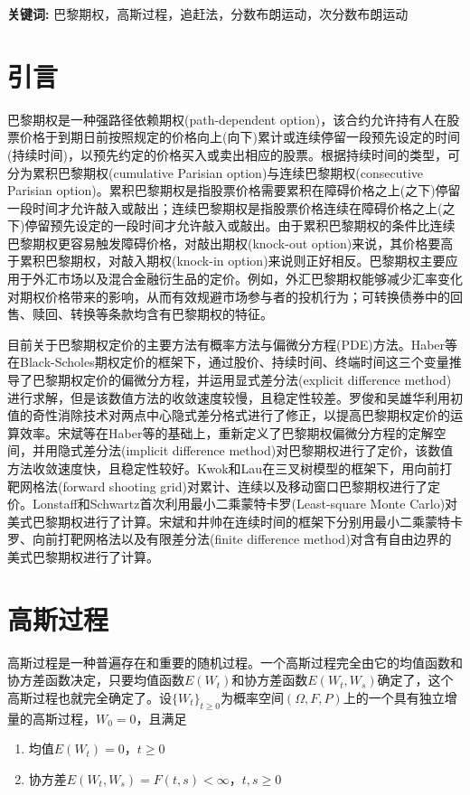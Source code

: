 \documentclass{ctexart} %
\begin{document}
{\bf 关键词: }巴黎期权，高斯过程，追赶法，分数布朗运动，次分数布朗运动

\section{引言}
巴黎期权是一种强路径依赖期权(path-dependent option)，该合约允许持有人在股票价格于到期日前按照规定的价格向上(向下)累计或连续停留一段预先设定的时间(持续时间)，以预先约定的价格买入或卖出相应的股票。根据持续时间的类型，可分为累积巴黎期权(cumulative Parisian option)与连续巴黎期权(consecutive Parisian option)。累积巴黎期权是指股票价格需要累积在障碍价格之上(之下)停留一段时间才允许敲入或敲出；连续巴黎期权是指股票价格连续在障碍价格之上(之下)停留预先设定的一段时间才允许敲入或敲出。由于累积巴黎期权的条件比连续巴黎期权更容易触发障碍价格，对敲出期权(knock-out option)来说，其价格要高于累积巴黎期权，对敲入期权(knock-in option)来说则正好相反。巴黎期权主要应用于外汇市场以及混合金融衍生品的定价。例如，外汇巴黎期权能够减少汇率变化对期权价格带来的影响，从而有效规避市场参与者的投机行为；可转换债券中的回售、赎回、转换等条款均含有巴黎期权的特征。

目前关于巴黎期权定价的主要方法有概率方法与偏微分方程(PDE)方法。Haber等在Black-Scholes期权定价的框架下，通过股价、持续时间、终端时间这三个变量推导了巴黎期权定价的偏微分方程，并运用显式差分法(explicit difference method)进行求解，但是该数值方法的收敛速度较慢，且稳定性较差。罗俊和吴雄华利用初值的奇性消除技术对两点中心隐式差分格式进行了修正，以提高巴黎期权定价的运算效率。宋斌等在Haber等的基础上，重新定义了巴黎期权偏微分方程的定解空间，并用隐式差分法(implicit difference method)对巴黎期权进行了定价，该数值方法收敛速度快，且稳定性较好。Kwok和Lau在三叉树模型的框架下，用向前打靶网格法(forward shooting grid)对累计、连续以及移动窗口巴黎期权进行了定价。Lonstaff和Schwartz首次利用最小二乘蒙特卡罗(Least-square Monte Carlo)对美式巴黎期权进行了计算。宋斌和井帅在连续时间的框架下分别用最小二乘蒙特卡罗、向前打靶网格法以及有限差分法(finite difference method)对含有自由边界的美式巴黎期权进行了计算。

\section{高斯过程}
高斯过程是一种普遍存在和重要的随机过程。一个高斯过程完全由它的均值函数和协方差函数决定，只要均值函数$E(W_t)$和协方差函数$E(W_t,W_s)$确定了，这个高斯过程也就完全确定了。设$\{W_t\}_{t\geq 0}$为概率空间$(\Omega,F,P)$上的一个具有独立增量的高斯过程，$W_0=0$，且满足
\begin{enumerate}[(1)]
\item 均值$E(W_t)=0$，$t\geq 0$
\item 协方差$E(W_t,W_s)=F(t,s)<\infty$，$t,s\geq 0$
\end{enumerate}
\end{document}
